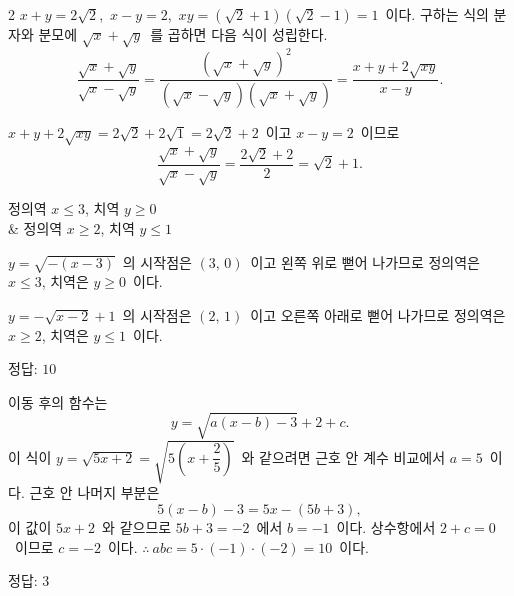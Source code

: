 \documentclass[10pt,fleqn]{article}
\begin{document}
\begin{multicols*}{2}
$x+y=2\sqrt{2}$,\ $x-y=2$,\ $xy=(\sqrt{2}+1)(\sqrt{2}-1)=1$\ 이다. 구하는 식의 분자와 분모에 $\sqrt{x}+\sqrt{y}$\ 를 곱하면 다음 식이 성립한다.
\[ \dfrac{\sqrt{x}+\sqrt{y}}{\sqrt{x}-\sqrt{y}}=\dfrac{(\sqrt{x}+\sqrt{y})^{2}}{(\sqrt{x}-\sqrt{y})(\sqrt{x}+\sqrt{y})}=\dfrac{x+y+2\sqrt{xy}}{x-y}. \]

$x+y+2\sqrt{xy}=2\sqrt{2}+2\sqrt{1}=2\sqrt{2}+2$\ 이고 $x-y=2$\ 이므로
\[ \dfrac{\sqrt{x}+\sqrt{y}}{\sqrt{x}-\sqrt{y}}=\dfrac{2\sqrt{2}+2}{2}=\sqrt{2}+1. \]

\begin{dmanslist}
 정의역 $x \le 3$, 치역 $y \ge 0$ \\
&  정의역 $x \ge 2$, 치역 $y \le 1$
\end{dmanslist}

 $y=\sqrt{-(x-3)}$\ 의 시작점은 $(3,\, 0)$\ 이고 왼쪽 위로 뻗어 나가므로 정의역은 $x \le 3$, 치역은 $y \ge 0$\ 이다.

 $y=-\sqrt{x-2}+1$\ 의 시작점은 $(2,\, 1)$\ 이고 오른쪽 아래로 뻗어 나가므로 정의역은 $x \ge 2$, 치역은 $y \le 1$\ 이다.

\begin{dmanswerbox}
정답: $10$
\end{dmanswerbox}

이동 후의 함수는
\[ y=\sqrt{a(x-b)-3}+2+c. \]
이 식이 $y=\sqrt{5x+2}=\sqrt{5\!\left(x+\dfrac{2}{5}\right)}$\ 와 같으려면 근호 안 계수 비교에서 $a=5$\ 이다. 근호 안 나머지 부분은
\[ 5(x-b)-3=5x-(5b+3), \]
이 값이 $5x+2$\ 와 같으므로 $5b+3=-2$\ 에서 $b=-1$\ 이다. 상수항에서 $2+c=0$\ 이므로 $c=-2$\ 이다. $\therefore\ abc=5\cdot(-1)\cdot(-2)=10$\ 이다.

\begin{dmanswerbox}
정답: $3$
\end{dmanswerbox}


\end{multicols*}
\end{document}
